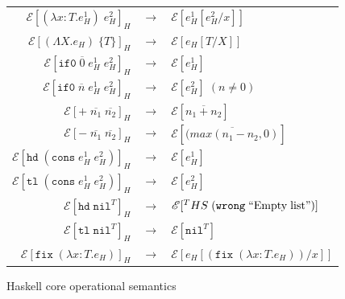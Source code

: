 \begin{figure}
\onehalfspacing
\begin{center}
\begin{tabular}{rcl}
$\mathscr{E}[(\lambda x:T.e_{H}^{1})\;e_{H}^{2}]_{H}$ & $\rightarrow$ & $\mathscr{E}[e_{H}^{1}[e_{H}^{2}/x]]$ \\
$\mathscr{E}[(\Lambda X.e_{H})\;\lbrace T\rbrace]_{H}$ & $\rightarrow$ & $\mathscr{E}[e_{H}[T/X]]$ \\
$\mathscr{E}[\mathtt{if0}\;\overline{0}\;e_{H}^{1}\;e_{H}^{2}]_{H}$ & $\rightarrow$ & $\mathscr{E}[e_{H}^{1}]$ \\
$\mathscr{E}[\mathtt{if0}\;\overline{n}\;e_{H}^{1}\;e_{H}^{2}]_{H}$ & $\rightarrow$ & $\mathscr{E}[e_{H}^{2}]\;(n\neq0)$ \\
$\mathscr{E}[+\;\overline{n_{1}}\;\overline{n_{2}}]_{H}$ & $\rightarrow$ & $\mathscr{E}[\overline{n_{1}+n_{2}}]$ \\
$\mathscr{E}[-\;\overline{n_{1}}\;\overline{n_{2}}]_{H}$ & $\rightarrow$ & $\mathscr{E}[\overline{(max(n_{1}-n_{2},0)}]$ \\
$\mathscr{E}[\mathtt{hd}\;(\mathtt{cons}\;e_{H}^{1}\;e_{H}^{2})]_{H}$ & $\rightarrow$ & $\mathscr{E}[e_{H}^{1}]$ \\
$\mathscr{E}[\mathtt{tl}\;(\mathtt{cons}\;e_{H}^{1}\;e_{H}^{2})]_{H}$ & $\rightarrow$ & $\mathscr{E}[e_{H}^{2}]$ \\
$\mathscr{E}[\mathtt{hd}\;\mathtt{nil}^{T}]_{H}$ & $\rightarrow$ & $\mathscr{E}[^{T}HS\;(\mathtt{wrong}\;\mathrm{``Empty\;list"})]$ \\
$\mathscr{E}[\mathtt{tl}\;\mathtt{nil}^{T}]_{H}$ & $\rightarrow$ & $\mathscr{E}[\mathtt{nil}^{T}]$ \\
$\mathscr{E}[\mathtt{fix}\;(\lambda x:T.e_{H})]_{H}$ & $\rightarrow$ & $\mathscr{E}[e_{H}[(\mathtt{fix}\;(\lambda x:T.e_{H}))/x]]$
\end{tabular}
\end{center}
\caption{Haskell core operational semantics}
\label{fig:hcos}
\end{figure}